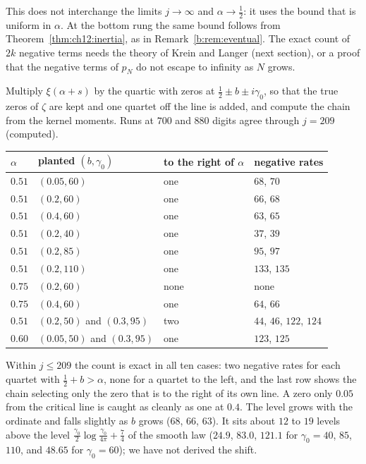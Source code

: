 This does not interchange the limits $j\to\infty$ and $\alpha\to\frac12$: it uses the bound that is uniform in $\alpha$. At the bottom rung the same bound follows from Theorem~\ref{thm:ch12:inertia}, as in Remark~\ref{b:rem:eventual}. The exact count of $2k$ negative terms needs the theory of Krein and Langer (next section), or a proof that the negative terms of $p_N$ do not escape to infinity as $N$ grows.

\begin{computation}\label{h:comp:plant}
Multiply $\xi(\alpha+s)$ by the quartic with zeros at $\frac12\pm b\pm i\gamma_0$, so that the true zeros of $\zeta$ are kept and one quartet off the line is added, and compute the chain from the kernel moments. Runs at $700$ and $880$ digits agree through $j=209$ (computed).
\begin{center}\small
\begin{tabular}{@{}llll@{}}
\toprule
$\alpha$ & planted $(b,\gamma_0)$ & to the right of $\alpha$ & negative rates\\
\midrule
$0.51$ & $(0.05,60)$ & one & $68$, $70$\\
$0.51$ & $(0.2,60)$ & one & $66$, $68$\\
$0.51$ & $(0.4,60)$ & one & $63$, $65$\\
$0.51$ & $(0.2,40)$ & one & $37$, $39$\\
$0.51$ & $(0.2,85)$ & one & $95$, $97$\\
$0.51$ & $(0.2,110)$ & one & $133$, $135$\\
$0.75$ & $(0.2,60)$ & none & none\\
$0.75$ & $(0.4,60)$ & one & $64$, $66$\\
$0.51$ & $(0.2,50)$ and $(0.3,95)$ & two & $44$, $46$, $122$, $124$\\
$0.60$ & $(0.05,50)$ and $(0.3,95)$ & one & $123$, $125$\\
\bottomrule
\end{tabular}
\end{center}
\end{computation}

Within $j\le209$ the count is exact in all ten cases: two negative rates for each quartet with $\frac12+b>\alpha$, none for a quartet to the left, and the last row shows the chain selecting only the zero that is to the right of its own line. A zero only $0.05$ from the critical line is caught as cleanly as one at $0.4$. The level grows with the ordinate and falls slightly as $b$ grows ($68$, $66$, $63$). It sits about $12$ to $19$ levels above the level $\frac{\gamma_0}{2}\log\frac{\gamma_0}{4\pi}+\frac74$ of the smooth law ($24.9$, $83.0$, $121.1$ for $\gamma_0=40$, $85$, $110$, and $48.65$ for $\gamma_0=60$); we have not derived the shift.

